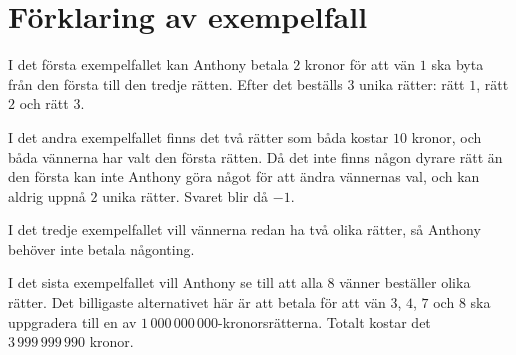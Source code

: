 \section*{Förklaring av exempelfall}
I det första exempelfallet kan Anthony betala $2$ kronor för att vän $1$ ska byta från den första till den tredje rätten. Efter det beställs $3$ unika rätter: rätt $1$, rätt $2$ och rätt $3$.

I det andra exempelfallet finns det två rätter som båda kostar $10$ kronor, och båda vännerna har valt den första rätten. Då det inte finns någon dyrare rätt än den första kan inte Anthony göra något för att ändra vännernas val, och kan aldrig uppnå $2$ unika rätter. Svaret blir då $-1$.

I det tredje exempelfallet vill vännerna redan ha två olika rätter, så Anthony behöver inte betala någonting.

I det sista exempelfallet vill Anthony se till att alla $8$ vänner beställer olika rätter. Det billigaste alternativet här är att betala för att vän $3$, $4$, $7$ och $8$ ska uppgradera till en av $1\,000\,000\,000$-kronorsrätterna. Totalt kostar det $3\,999\,999\,990$ kronor.
